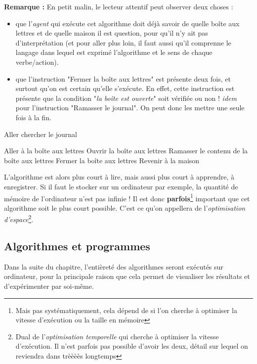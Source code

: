 \documentclass[../../main.tex]{subfiles}
\begin{document}
\textbf{Remarque :} En petit malin, le lecteur attentif peut observer deux choses :
\begin{itemize}
	\item que l'\textit{agent} qui exécute cet algorithme doit déjà savoir de quelle boîte aux lettres et de quelle maison il est question, pour qu'il n'y ait pas d'interprétation (et pour aller plus loin, il faut aussi qu'il comprenne le langage dans lequel est exprimé l'algorithme et le sens de chaque verbe/action).
	\item que l'instruction "Fermer la boîte aux lettres" est présente deux fois, et surtout qu'on est certain qu'elle s'exécute. En effet, cette instruction est présente que la condition "\textit{la boîte est ouverte}" soit vérifiée ou non ! \textit{idem} pour l'instruction "Ramasser le journal". On peut donc les mettre une seule fois à la fin.
\end{itemize}
\begin{algorithm}
\caption{Aller chercher le journal}\label{alg:optletters}
Aller à la boîte aux lettres\;
 {
} {
	Ouvrir la boîte aux lettres\;
}
Ramasser le contenu de la boîte aux lettres\;
Fermer la boîte aux lettres\;
Revenir à la maison\;
\end{algorithm}
L'algorithme est alors plus court à lire, mais aussi plus court à apprendre, à enregistrer. Si il faut le stocker sur un ordinateur par exemple, la quantité de mémoire de l'ordinateur n'est pas infinie ! Il est donc \textbf{parfois}\footnote{Mais pas systématiquement, cela dépend de si l'on cherche à optimiser la vitesse d'exécution ou la taille en mémoire} important que cet algorithme soit le plus court possible. C'est ce qu'on appellera de l'\textit{optimisation d'espace}\footnote{Dual de l'\textit{optimisation temporelle} qui cherche à optimiser la vitesse d'exécution. Il n'est parfois pas possible d'avoir les deux, détail sur lequel on reviendra dans trèèèès longtemps}.
\subsection{Algorithmes et programmes}

Dans la suite du chapitre, l'entièreté des algorithmes seront exécutés sur ordinateur, pour la principale raison que cela permet de visualiser les résultats et d'expérimenter par soi-même.
\end{document}

